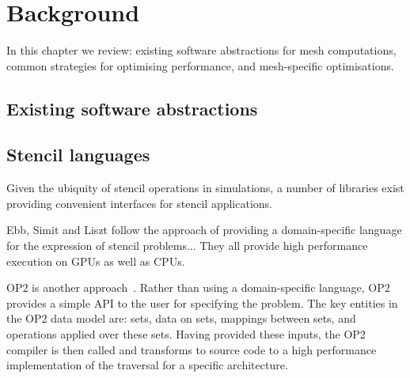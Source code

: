 \section{Background}

In this chapter we review: existing software abstractions for mesh computations, common strategies for optimising performance, and mesh-specific optimisations.

\subsection{Existing software abstractions}

\subsection{Stencil languages}
\label{sec:stencillang}


Given the ubiquity of stencil operations in simulations, a number of libraries exist providing convenient interfaces for stencil applications.


Ebb, Simit and Liszt follow the approach of providing a domain-specific language for the expression of stencil problems...
They all provide high performance execution on GPUs as well as CPUs.


OP2 is another approach~\cite{mudaligeOP2ActiveLibrary2012,mudaligeDesignInitialPerformance2013}.
Rather than using a domain-specific language, OP2 provides a simple API to the user for specifying the problem.
The key entities in the OP2 data model are: sets, data on sets, mappings between sets, and operations applied over these sets.
Having provided these inputs, the OP2 compiler is then called and transforms to source code to a high performance implementation of the traversal for a specific architecture.


